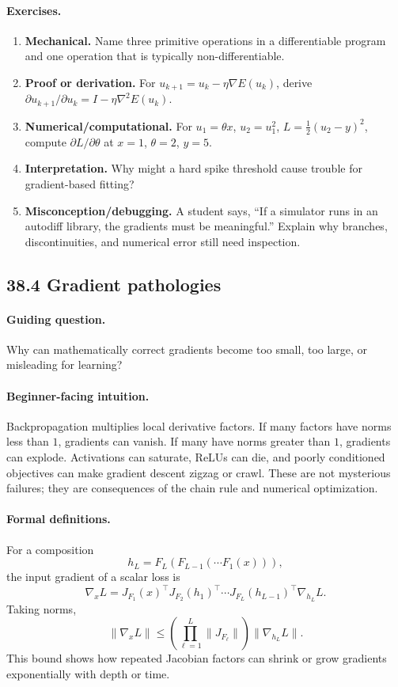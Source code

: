 \paragraph{Exercises.}
\begin{enumerate}[label=\textbf{38.3.\arabic*.}, leftmargin=*]
\item \textbf{Mechanical.} Name three primitive operations in a differentiable program and one operation that is typically non-differentiable.
\item \textbf{Proof or derivation.} For \(u_{k+1}=u_k-\eta\nabla E(u_k)\), derive \(\partial u_{k+1}/\partial u_k=I-\eta\nabla^2E(u_k)\).
\item \textbf{Numerical/computational.} For \(u_1=\theta x\), \(u_2=u_1^2\), \(L=\frac12(u_2-y)^2\), compute \(\partial L/\partial\theta\) at \(x=1\), \(\theta=2\), \(y=5\).
\item \textbf{Interpretation.} Why might a hard spike threshold cause trouble for gradient-based fitting?
\item \textbf{Misconception/debugging.} A student says, ``If a simulator runs in an autodiff library, the gradients must be meaningful.'' Explain why branches, discontinuities, and numerical error still need inspection.
\end{enumerate}

\subsection{38.4 Gradient pathologies}

\paragraph{Guiding question.}
Why can mathematically correct gradients become too small, too large, or misleading for learning?

\paragraph{Beginner-facing intuition.}
Backpropagation multiplies local derivative factors. If many factors have norms less than \(1\), gradients can vanish. If many have norms greater than \(1\), gradients can explode. Activations can saturate, ReLUs can die, and poorly conditioned objectives can make gradient descent zigzag or crawl. These are not mysterious failures; they are consequences of the chain rule and numerical optimization.

\paragraph{Formal definitions.}
For a composition
\[
h_L=F_L(F_{L-1}(\cdots F_1(x))),
\]
the input gradient of a scalar loss is
\[
\nabla_xL
=J_{F_1}(x)^\top J_{F_2}(h_1)^\top\cdots J_{F_L}(h_{L-1})^\top\nabla_{h_L}L.
\]
Taking norms,
\[
\|\nabla_xL\|
\leq
\left(\prod_{\ell=1}^L \|J_{F_\ell}\|\right)\|\nabla_{h_L}L\|.
\]
This bound shows how repeated Jacobian factors can shrink or grow gradients exponentially with depth or time.


